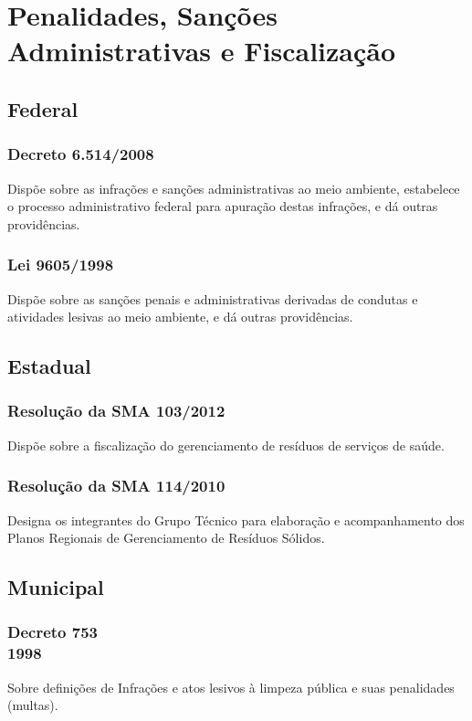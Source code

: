 \section{Penalidades, Sanções Administrativas e Fiscalização}

\begin{subapend}
	\subsection{Federal}
	\begin{subsubapend}
		\subsubsection{Decreto 6.514/2008}
		Dispõe sobre as infrações e sanções administrativas ao meio ambiente, estabelece o processo administrativo federal para apuração destas infrações, e dá outras providências.
		\subsubsection{Lei 9605/1998}
		Dispõe sobre as sanções penais e administrativas derivadas de condutas e atividades lesivas ao meio ambiente, e dá outras providências.
	\end{subsubapend}
\end{subapend}



\begin{subapend}
	\subsection{Estadual}
	\begin{subsubapend}
		\subsubsection{Resolução da SMA 103/2012}
		Dispõe sobre a fiscalização do gerenciamento de resíduos de serviços de saúde.
		\subsubsection{Resolução da SMA 114/2010}
		Designa os integrantes do Grupo Técnico para elaboração e acompanhamento dos Planos Regionais de Gerenciamento de Resíduos Sólidos.
		\subsection{Municipal}
		\subsubsection{Decreto 753\\1998}
		Sobre definições de Infrações e atos lesivos à limpeza pública e suas penalidades (multas).
	\end{subsubapend}
\end{subapend}



